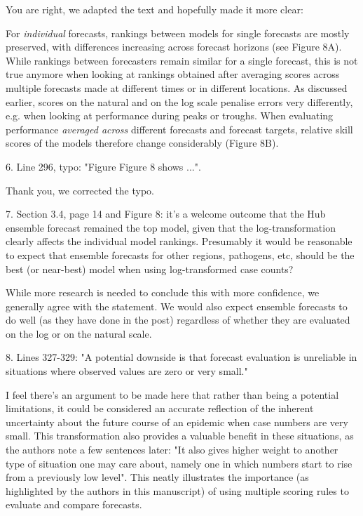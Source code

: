 \documentclass{article}
\newcommand{\black}{\color{black}}
\newcommand{\blue}{\color{blue}}
\newcommand{\indented}{\setlength{\leftskip}{1cm}}
\newcommand{\notindented}{\setlength{\leftskip}{0cm}}
\begin{document}
\black
You are right, we adapted the text and hopefully made it more clear: 

\indented

For \textit{individual} forecasts, rankings between models for single forecasts are mostly preserved, with differences increasing across forecast horizons (see Figure 8A). While rankings between forecasters remain similar for a single forecast, this is not true anymore when looking at rankings obtained after averaging scores across multiple forecasts made at different times or in different locations. As discussed earlier, scores on the natural and on the log scale penalise errors very differently, e.g. when looking at performance during peaks or troughs. When evaluating performance \textit{averaged across} different forecasts and forecast targets, relative skill scores of the models therefore change considerably (Figure 8B).

\notindented

\blue
6. Line 296, typo: "Figure Figure 8 shows ...".

\black
Thank you, we corrected the typo. 

\blue
7. Section 3.4, page 14 and Figure 8: it's a welcome outcome that the Hub ensemble forecast remained the top model, given that the log-transformation clearly affects the individual model rankings. Presumably it would be reasonable to expect that ensemble forecasts for other regions, pathogens, etc, should be the best (or near-best) model when using log-transformed case counts?

\black
While more research is needed to conclude this with more confidence, we generally agree with the statement. We would also expect ensemble forecasts to do well (as they have done in the post) regardless of whether they are evaluated on the log or on the natural scale. 

\blue
8. Lines 327-329: "A potential downside is that forecast evaluation is unreliable in situations where observed values are zero or very small."

I feel there's an argument to be made here that rather than being a potential limitations, it could be considered an accurate reflection of the inherent uncertainty about the future course of an epidemic when case numbers are very small. This transformation also provides a valuable benefit in these situations, as the authors note a few sentences later: "It also gives higher weight to another type of situation one may care about, namely one in which numbers start to rise from a previously low level". This neatly illustrates the importance (as highlighted by the authors in this manuscript) of using multiple scoring rules to evaluate and compare forecasts.
\end{document}
